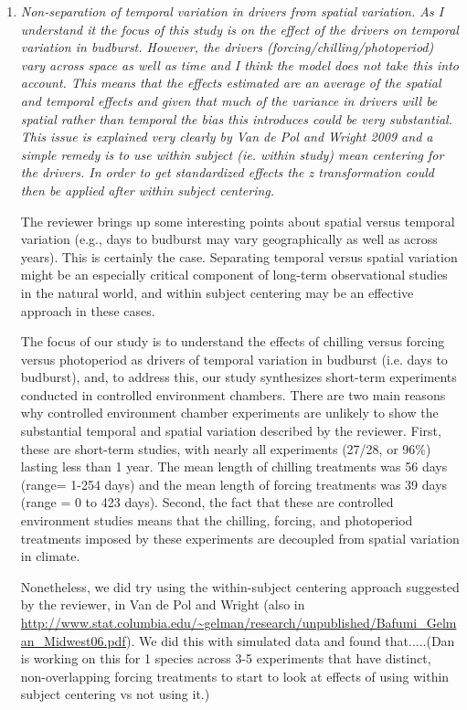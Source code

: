 \documentclass[11pt, a4paper]{article}
\begin{document}
\begin{enumerate}
\item \emph{Non-separation of temporal variation in drivers from spatial variation. As I understand it the
focus of this study is on the effect of the drivers on temporal variation in budburst. However,
the drivers (forcing/chilling/photoperiod) vary across space as well as time and I think the
model does not take this into account. This means that the effects estimated are an average of
the spatial and temporal effects and given that much of the variance in drivers will be spatial
rather than temporal the bias this introduces could be very substantial. This issue is explained
very clearly by Van de Pol and Wright 2009 and a simple remedy is to use within subject (ie.
within study) mean centering for the drivers. In order to get standardized effects the z
transformation could then be applied after within subject centering.}
\par The reviewer brings up some interesting points about spatial versus temporal variation (e.g., days to budburst may vary geographically as well as across years). This is certainly the case. Separating temporal versus spatial variation might be an especially critical component of long-term observational studies in the natural world, and within subject centering may be an effective approach in these cases.  
\par The focus of our study is to understand the effects of chilling versus forcing versus photoperiod as drivers of temporal variation in budburst (i.e. days to budburst), and, to address this, our study synthesizes short-term experiments conducted in controlled environment chambers. There are two main reasons why controlled environment chamber experiments are unlikely to show the substantial temporal and spatial variation described by the reviewer. First, these are short-term studies, with nearly all experiments (27/28, or 96\%) lasting less than 1 year. The mean length of chilling treatments was 56 days (range= 1-254 days) and the mean length of forcing treatments was 39 days (range = 0 to 423 days). Second, the fact that these are controlled environment studies means that the chilling, forcing, and photoperiod treatments imposed by these experiments are decoupled from spatial variation in climate. 

\par Nonetheless, we did try using the within-subject centering approach suggested by the reviewer,  in Van de Pol and Wright (also in \url{http://www.stat.columbia.edu/~gelman/research/unpublished/Bafumi_Gelman_Midwest06.pdf}). We did this with simulated data and found that.....(Dan is working on this for 1 species across 3-5 experiments that have distinct, non-overlapping forcing treatments to start to look at effects of using within subject centering vs not using it.)


\end{enumerate}
\end{document}
